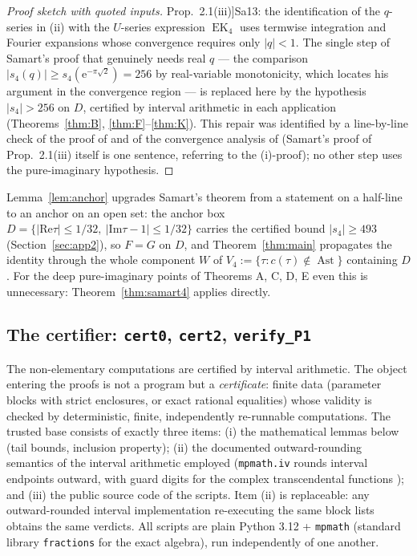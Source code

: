 \documentclass[11pt]{article}
\newcommand{\e}{\mathrm{e}}
\newcommand{\ReT}{\mathrm{Re}}
\newcommand{\ImT}{\mathrm{Im}}
\DeclareMathOperator{\EK}{EK}
\DeclareMathOperator{\Ast}{Ast}
\theoremstyle{definition}
\theoremstyle{remark}
\begin{document}
\begin{proof}[Proof sketch with quoted inputs]
Prop.~2.1(iii)]{Sa13}: the identification of the $q$-series in (ii)
with the $U$-series expression $\EK_4$ uses termwise integration and
Fourier expansions whose convergence requires only $|q|<1$. The
single step of Samart's proof that genuinely needs real $q$ --- the
comparison $|s_4(q)|\ge s_4(\e^{-\pi\sqrt2})=256$ by real-variable
monotonicity, which locates his argument in the convergence region
--- is replaced here by the hypothesis $|s_4|>256$ on $D$, certified
by interval arithmetic in each application
(Theorems~\ref{thm:B}, \ref{thm:F}--\ref{thm:K}). This repair was identified
by a line-by-line check of the proof of \cite[Prop.~2.1(i)]{Sa13}
and of the convergence analysis of \cite[Thm.~2.3]{Ro} (Samart's
proof of Prop.~2.1(iii) itself is one sentence, referring to the
(i)-proof); no other step uses the pure-imaginary hypothesis.
\end{proof}

Lemma~\ref{lem:anchor} upgrades Samart's theorem from a statement on
a half-line to an anchor on an open set: the anchor box
$D=\{|\ReT\tau|\le1/32,\ |\ImT\tau-1|\le1/32\}$ carries the
certified bound $|s_4|\ge493$ (Section~\ref{sec:app2}), so $F=G$ on
$D$, and Theorem~\ref{thm:main} propagates the identity through the
whole component $W$ of $V_4:=\{\tau:c(\tau)\notin\Ast\}$ containing
$D$. For the deep pure-imaginary points of Theorems A, C, D, E even
this is unnecessary: Theorem~\ref{thm:samart4} applies directly.

\subsection{The certifier: \texttt{cert0}, \texttt{cert2},
\texttt{verify\_P1}}\label{sec:cert}

The non-elementary computations are certified by interval arithmetic.
The object entering the proofs is not a program but a
\emph{certificate}: finite data (parameter blocks with strict
enclosures, or exact rational equalities) whose validity is checked
by deterministic, finite, independently re-runnable computations.
The trusted base consists of exactly three items:
(i) the mathematical lemmas below (tail bounds, inclusion property);
(ii) the documented outward-rounding semantics of the interval
arithmetic employed (\texttt{mpmath.iv} rounds interval endpoints
outward, with guard digits for the complex transcendental functions
\cite{mpmath,ivdoc}); and (iii) the public source code of the
scripts. Item (ii) is replaceable: any outward-rounded interval
implementation re-executing the same block lists obtains the same
verdicts. All scripts are plain Python 3.12 + \texttt{mpmath}
\cite{mpmath} (standard library \texttt{fractions} for the exact
algebra), run independently of one another.
\end{document}
